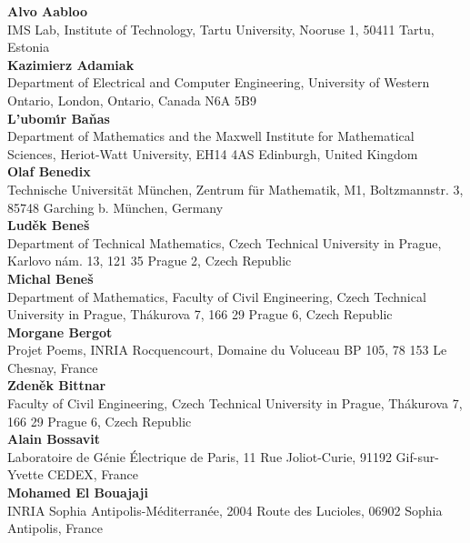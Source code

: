 \noindent
{\bf Alvo Aabloo}\\
IMS Lab,
Institute of Technology,
Tartu University,
Nooruse 1,
50411 Tartu,
Estonia\\

\noindent
{\bf Kazimierz Adamiak}\\
Department of Electrical and Computer Engineering,
University of Western Ontario,
London, Ontario,
Canada N6A 5B9\\

\noindent
{\bf L'ubom\'{\i}r Ba\v nas}\\
Department of Mathematics and the Maxwell Institute for Mathematical Sciences,
Heriot-Watt University,
EH14 4AS Edinburgh,
United Kingdom\\

\noindent
{\bf Olaf Benedix}\\
Technische Universit\" at M\" unchen,
Zentrum f\" ur Mathematik, M1,
Boltzmannstr. 3,
85748 Garching b. M\" unchen,
Germany\\

\noindent
{\bf Lud\v ek Bene\v s}\\
Department of Technical Mathematics,
Czech Technical University in Prague,
Karlovo n\'am. 13,
121 35 Prague 2,
Czech Republic\\

\noindent
{\bf Michal Bene\v s}\\
Department of Mathematics,
Faculty of Civil Engineering,
Czech Technical University in Prague,
Th\'akurova 7,
166 29 Prague 6,
Czech Republic\\

\noindent
{\bf Morgane Bergot}\\
Projet Poems,
INRIA Rocquencourt,
Domaine du Voluceau BP 105,
78 153 Le Chesnay,
France\\

\noindent
{\bf Zden\v ek Bittnar }\\
Faculty of Civil Engineering,
Czech Technical University in Prague,
Th\'akurova 7,
166 29 Prague 6,
Czech Republic\\

\noindent
{\bf Alain Bossavit}\\
Laboratoire de G\'enie \'Electrique de Paris,
11 Rue Joliot-Curie,
91192 Gif-sur-Yvette CEDEX,
France\\

\noindent
{\bf Mohamed El Bouajaji}\\
INRIA Sophia Antipolis-M\'editerran\'ee,
2004 Route des Lucioles,
06902 Sophia Antipolis,
France\\

